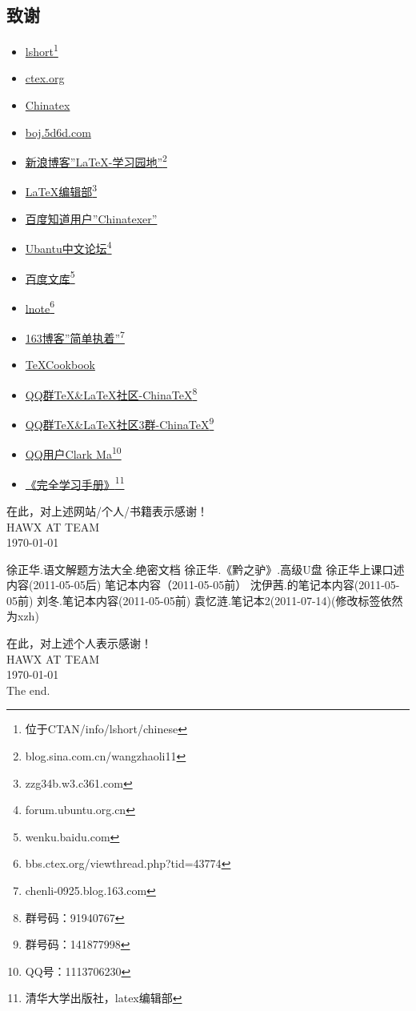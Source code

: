 \subsection{致谢}\label{thanks}
\begin{itemize}
\item \underline{lshort}\footnote{位于CTAN/info/lshort/chinese}
\item \underline{ctex.org}
\item \underline{Chinatex}
\item \underline{boj.5d6d.com}
\item \underline{新浪博客''LaTeX-学习园地''}\footnote{blog.sina.com.cn/wangzhaoli11}
\item \underline{LaTeX编辑部}\footnote{zzg34b.w3.c361.com}
\item \underline{百度知道用户''Chinatexer''}
\item \underline{Ubantu中文论坛}\footnote{forum.ubuntu.org.cn}
\item \underline{百度文库}\footnote{wenku.baidu.com}
\item \underline{lnote}\footnote{bbs.ctex.org/viewthread.php?tid=43774}
\item \underline{163博客''简单执着''}\footnote{chenli-0925.blog.163.com}
\item \underline{\TeX Cookbook}
\item \underline{QQ群TeX\&LaTeX社区-ChinaTeX}\footnote{群号码：91940767}
\item \underline{QQ群TeX\&LaTeX社区3群-ChinaTeX}\footnote{群号码：141877998}
\item \underline{QQ用户Clark Ma}\footnote{QQ号：1113706230}
\item \underline{《\LaTeXe 完全学习手册》}\footnote{清华大学出版社，latex编辑部}
\end{itemize}
在此，对上述网站/个人/书籍表示感谢！\\
HAWX AT TEAM\\
\today\\ %
\newpage
\begin{thebibliography}{99}
徐正华.语文解题方法大全.绝密文档
徐正华.《黔之驴》.高级U盘
徐正华上课口述内容(2011-05-05后)
笔记本内容（2011-05-05前）
沈伊茜.的笔记本内容(2011-05-05前)
刘冬.笔记本内容(2011-05-05前)
袁忆涟.笔记本2(2011-07-14)(修改标签依然为xzh)
\end{thebibliography}
在此，对上述个人表示感谢！\\
HAWX AT TEAM\\
\today\\
The end. \label{appendix} 